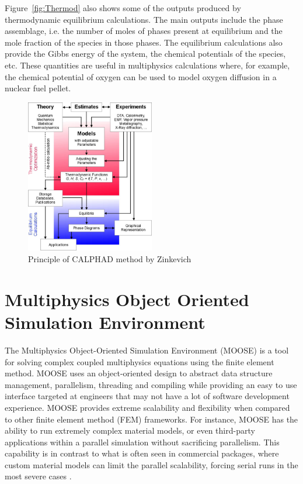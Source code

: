 Figure~\ref{fig:Thermod} also shows some of the outputs produced by thermodynamic equilibrium calculations. The main outputs include the phase assemblage, i.e. the number of moles of phases present at equilibrium and the mole fraction of the species in those phases. The equilibrium calculations also provide the Gibbs energy of the system, the chemical potentials of the species, etc. These quantities are useful in multiphysics calculations where, for example, the chemical potential of oxygen can be used to model oxygen diffusion in a  nuclear fuel pellet.
	\begin{figure}[htbp]
	\centering
	\includegraphics[width=0.5\textwidth]{figures/chapter-1/Calphad_method}
	\caption[Principle of CALPHAD method]{Principle of CALPHAD method by Zinkevich \cite{Zinkevich:2003aa}}
	\label{fig:calphad}
	\end{figure}

\section{Multiphysics Object Oriented Simulation Environment}
	The  Multiphysics Object-Oriented Simulation Environment {(MOOSE)} is a tool for solving complex coupled multiphysics equations using the finite element method. {MOOSE} uses an object-oriented design to abstract data structure management, parallelism, threading and compiling while providing an easy to use interface targeted at engineers that may not have a lot of software development experience. {MOOSE} provides extreme scalability and flexibility when compared to other finite element method (FEM) frameworks. For instance, {MOOSE} has the ability to run extremely complex material models, or even third-party applications within a parallel simulation without sacrificing parallelism. This capability is in contrast to what is often seen in commercial packages, where custom material models can limit the parallel scalability, forcing serial runs in the most severe cases \cite{gaston2015physics,moose-web-page}.


